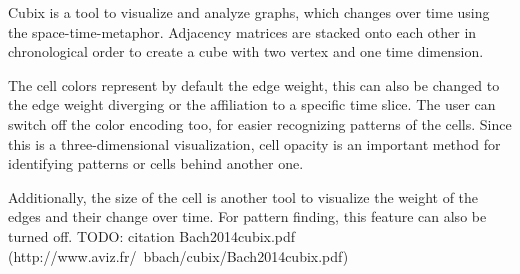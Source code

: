 Cubix is a tool to visualize and analyze graphs, which changes over time using the space-time-metaphor. Adjacency matrices are stacked onto each other in chronological order to create a cube with two vertex and one time dimension.

The cell colors represent by default the edge weight, this can also be changed to the edge weight diverging or the affiliation to a specific time slice. The user can switch off the color encoding too, for easier recognizing patterns of the cells. Since this is a three-dimensional visualization, cell opacity is an important method for identifying patterns or cells behind another one. 

Additionally, the size of the cell is another tool to visualize the weight of the edges and their change over time. For pattern finding, this feature can also be turned off. TODO: citation Bach2014cubix.pdf (http://www.aviz.fr/~bbach/cubix/Bach2014cubix.pdf)

